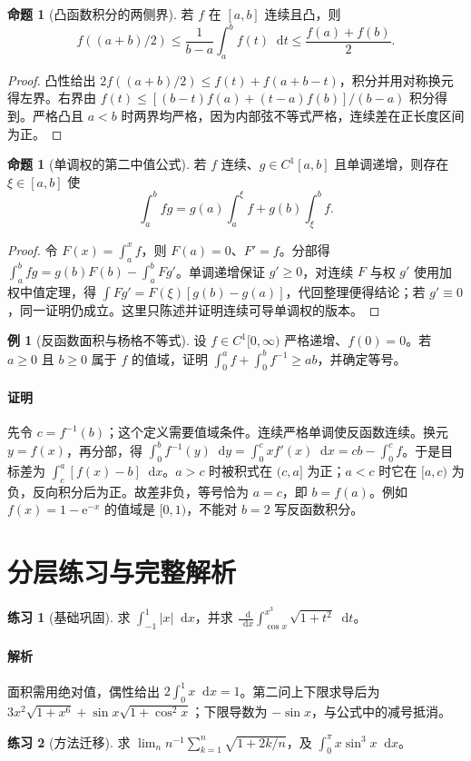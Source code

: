 \documentclass[UTF8,fontset=fandol,12pt,oneside,openany]{ctexrep}
\newcommand{\dd}{\mathop{}\!\mathrm d}
\newcommand{\ee}{\mathrm e}
\theoremstyle{definition}
\newtheorem{proposition}[theorem]{命题}
\newtheorem{example}{例}[chapter]
\newtheorem{exercise}{练习}[chapter]
\begin{document}
\begin{proposition}[凸函数积分的两侧界]
若 $f$ 在 $[a,b]$ 连续且凸，则
\[f((a+b)/2)\le\frac1{b-a}\int_a^bf(t)\dd t\le\frac{f(a)+f(b)}2.\]
\end{proposition}
\begin{proof}
凸性给出 $2f((a+b)/2)\le f(t)+f(a+b-t)$，积分并用对称换元得左界。右界由 $f(t)\le[(b-t)f(a)+(t-a)f(b)]/(b-a)$ 积分得到。严格凸且 $a<b$ 时两界均严格，因为内部弦不等式严格，连续差在正长度区间为正。
\end{proof}
\begin{proposition}[单调权的第二中值公式]
若 $f$ 连续、$g\in C^1[a,b]$ 且单调递增，则存在 $\xi\in[a,b]$ 使
\[\int_a^bfg=g(a)\int_a^\xi f+g(b)\int_\xi^bf.\]
\end{proposition}
\begin{proof}
令 $F(x)=\int_a^xf$，则 $F(a)=0$、$F'=f$。分部得 $\int_a^bfg=g(b)F(b)-\int_a^bFg'$。单调递增保证 $g'\ge0$，对连续 $F$ 与权 $g'$ 使用加权中值定理，得 $\int Fg'=F(\xi)[g(b)-g(a)]$，代回整理便得结论；若 $g'\equiv0$，同一证明仍成立。这里只陈述并证明连续可导单调权的版本。
\end{proof}
\begin{example}[反函数面积与杨格不等式]
设 $f\in C^1[0,\infty)$ 严格递增、$f(0)=0$。若 $a\ge0$ 且 $b\ge0$ 属于 $f$ 的值域，证明 $\int_0^af+\int_0^bf^{-1}\ge ab$，并确定等号。
\end{example}
\paragraph{证明} 先令 $c=f^{-1}(b)$；这个定义需要值域条件。连续严格单调使反函数连续。换元 $y=f(x)$，再分部，得 $\int_0^bf^{-1}(y)\dd y=\int_0^cxf'(x)\dd x=cb-\int_0^cf$。于是目标差为 $\int_c^a[f(x)-b]\dd x$。$a>c$ 时被积式在 $(c,a]$ 为正；$a<c$ 时它在 $[a,c)$ 为负，反向积分后为正。故差非负，等号恰为 $a=c$，即 $b=f(a)$。例如 $f(x)=1-\ee^{-x}$ 的值域是 $[0,1)$，不能对 $b=2$ 写反函数积分。

\section{分层练习与完整解析}
\begin{exercise}[基础巩固]
求 $\int_{-1}^1|x|\dd x$，并求 $\frac{\dd}{\dd x}\int_{\cos x}^{x^3}\sqrt{1+t^2}\dd t$。
\end{exercise}
\paragraph{解析} 面积需用绝对值，偶性给出 $2\int_0^1x\dd x=1$。第二问上下限求导后为 $3x^2\sqrt{1+x^6}+\sin x\sqrt{1+\cos^2x}$；下限导数为 $-\sin x$，与公式中的减号抵消。
\begin{exercise}[方法迁移]
求 $\lim_n n^{-1}\sum_{k=1}^n\sqrt{1+2k/n}$，及 $\int_0^\pi x\sin^3x\dd x$。
\end{exercise}
\end{document}
